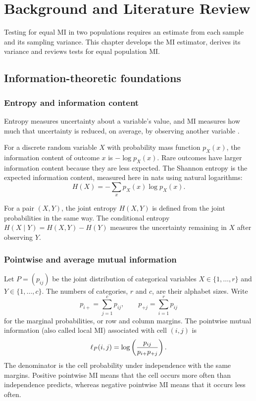 \chapter{Background and Literature Review}
\label{chap:background}

Testing for equal MI in two populations requires an estimate from each
sample and its sampling variance. This chapter develops the MI estimator,
derives its variance and reviews tests for equal population MI.

\section{Information-theoretic foundations}

\subsection{Entropy and information content}

Entropy measures uncertainty about a variable's value, and MI measures how
much that uncertainty is reduced, on average, by observing another variable
\citep{shannon1948}.

For a discrete random variable \(X\) with probability mass function
\(p_X(x)\), the information content of outcome \(x\) is
\(-\log p_X(x)\).
Rare outcomes have larger information content because they are less expected.
The Shannon entropy is the expected information content, measured here in
nats using natural logarithms:
\begin{equation}
  H(X)=-\sum_x p_X(x)\log p_X(x).
  \label{eq:entropy}
\end{equation}

For a pair \((X,Y)\), the joint entropy \(H(X,Y)\) is defined from the joint
probabilities in the same way. The conditional entropy
\(
H(X\mid Y)=H(X,Y)-H(Y)
\)
measures the uncertainty remaining in \(X\) after observing \(Y\).

\subsection{Pointwise and average mutual information}

Let \(P=(p_{ij})\) be the joint distribution of categorical variables
\(X\in\{1,\ldots,r\}\) and \(Y\in\{1,\ldots,c\}\).
The numbers of categories, \(r\) and \(c\), are their alphabet sizes. Write
\begin{equation}
  p_{i+}=\sum_{j=1}^{c}p_{ij},
  \qquad
  p_{+j}=\sum_{i=1}^{r}p_{ij}
\end{equation}
for the marginal probabilities, or row and column margins. The pointwise
mutual information (also called local MI) associated with cell \((i,j)\) is
\begin{equation}
  \ell_P(i,j)
  =\log\left(\frac{p_{ij}}{p_{i+}p_{+j}}\right).
  \label{eq:background-pmi}
\end{equation}
The denominator is the cell probability under independence with the same
margins. Positive pointwise MI means that the cell occurs more often than
independence predicts, whereas negative pointwise MI means that it occurs
less often.


